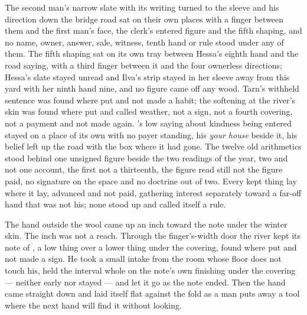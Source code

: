 The second man's narrow slate with its writing turned to the sleeve and his direction down the bridge road sat on their own places with a finger between them and the first man's face, the clerk's entered figure and the fifth shaping, and no name, owner, answer, sale, witness, tenth hand or rule stood under any of them. The fifth shaping sat on its own tray between Hessa's eighth hand and the road saying, with a third finger between it and the four ownerless directions; Hessa's slate stayed unread and Ilva's strip stayed in her sleeve away from this yard with her ninth hand nine, and no figure came off any wood. Tarn's withheld sentence was found where put and not made a habit; the softening at the river's skin was found where put and called weather, not a sign, not a fourth covering, not a payment and not made again. 's low saying about kindness being entered stayed on a place of its own with no payer standing, his \emph{your house} beside it, his belief left up the road with the box where it had gone. The twelve old arithmetics stood behind one unsigned figure beside the two readings of the year, two and not one account, the first not a thirteenth, the figure read still not the figure paid, no signature on the space and no doctrine out of two. Every kept thing lay where it lay, advanced and not paid, gathering interest separately toward a far-off hand that was not his; none stood up and called itself a rule.

The hand outside the wool came up an inch toward the note under the winter skin. The inch was not a reach. Through the finger's-width door the river kept its note of , a low thing over a lower thing under the covering, found where put and not made a sign. He took a small intake from the room whose floor does not touch his, held the interval whole on the note's own finishing under the covering --- neither early nor stayed --- and let it go as the note ended. Then the hand came straight down and laid itself flat against the fold as a man puts away a tool where the next hand will find it without looking.

